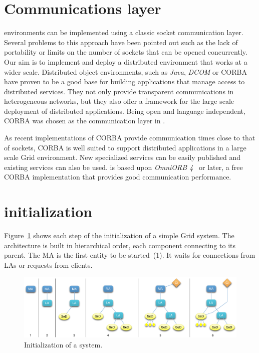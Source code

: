\section{Communications layer}
\label{sec:CORBA}

\nes environments can be implemented using a classic socket communication
layer. Several problems to this approach have been pointed out such as the lack
of portability or limits on the number of sockets that can be opened
concurrently. Our aim is to implement and deploy a distributed \nes environment
that works at a wider scale. Distributed object environments, such as
\emph{Java}, \emph{DCOM} or CORBA have proven to be a good base for building
applications that manage access to distributed services. They not only provide
transparent communications in heterogeneous networks, but they also offer a
framework for the large scale deployment of distributed applications. Being
open and language independent, CORBA was chosen as the communication layer in
\diet.

As recent implementations of CORBA provide communication times close
to that of sockets, CORBA is well suited to support distributed
applications in a large scale Grid environment. New specialized
services can be easily published and existing services can also be
used.  \diet is based upon \emph{OmniORB 4}~\cite{OMNIORB} or later, a
free CORBA implementation that provides good communication
performance.



\section{\diet initialization}
\label{init}

Figure~\ref{fig:init} shows each step of the initialization of a simple Grid
system. The architecture is built in hierarchical order, each component
connecting to its parent. The MA is the first entity to be started~(1). It
waits for connections from LAs or requests from clients.

\begin{figure}[hbt]
  \begin{center}
    \includegraphics[scale=.35]{fig/init}
    \caption{Initialization of a \diet system.}
    \label{fig:init}
  \end{center}
\end{figure}

